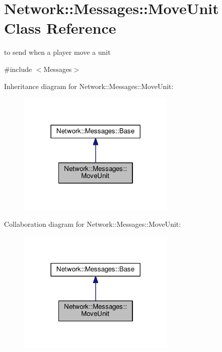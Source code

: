 \hypertarget{class_network_1_1_messages_1_1_move_unit}{}\section{Network\+:\+:Messages\+:\+:Move\+Unit Class Reference}
\label{class_network_1_1_messages_1_1_move_unit}


to send when a player move a unit  




{\ttfamily \#include $<$Messages$>$}



Inheritance diagram for Network\+:\+:Messages\+:\+:Move\+Unit\+:
\nopagebreak
\begin{figure}[H]
\begin{center}
\leavevmode
\includegraphics[width=213pt]{class_network_1_1_messages_1_1_move_unit__inherit__graph}
\end{center}
\end{figure}


Collaboration diagram for Network\+:\+:Messages\+:\+:Move\+Unit\+:
\nopagebreak
\begin{figure}[H]
\begin{center}
\leavevmode
\includegraphics[width=213pt]{class_network_1_1_messages_1_1_move_unit__coll__graph}
\end{center}
\end{figure}
